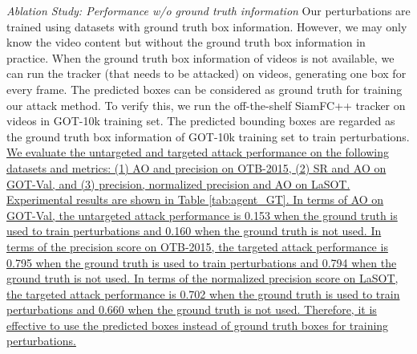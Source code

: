 \documentclass[journal]{IEEEtran}
\begin{document}
\textit{Ablation Study: Performance w/o ground truth information} Our perturbations are trained using datasets with ground truth box information.
However, we may only know the video content but without the ground truth box information in practice. When the ground truth box information of videos is not available, we can run the tracker (that needs to be attacked) on videos, generating one box for every frame. The predicted boxes can be considered as ground truth for training our attack method. To verify this, we run the off-the-shelf SiamFC++ tracker on videos in GOT-10k training set. The predicted bounding boxes are regarded as the ground truth box information of GOT-10k training set to train perturbations.
\uline{We evaluate the untargeted and targeted attack performance on the following datasets and metrics: (1) AO and precision on OTB-2015, (2) SR and AO on GOT-Val, and (3) precision, normalized precision and AO on LaSOT.
Experimental results are shown in Table \ref{tab:agent_GT}.
In terms of AO on GOT-Val, the untargeted attack performance is 0.153 when the ground truth is used to train perturbations and 0.160 when the ground truth is not used.
In terms of the precision score on OTB-2015, the targeted attack performance is 0.795 when the ground truth is used to train perturbations and 0.794 when the ground truth is not used.
In terms of the normalized precision score on LaSOT, the targeted attack performance is 0.702 when the ground truth is used to train perturbations and 0.660 when the ground truth is not used.
Therefore, it is effective to use the predicted boxes instead of ground truth boxes for training perturbations.
}
\end{document}
